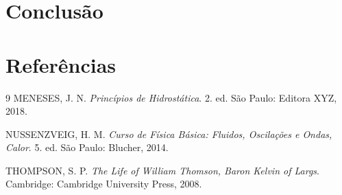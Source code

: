 \section{Conclusão}




\newpage
\section{Referências} {9}
	MENESES, J. N. \textit{Princípios de Hidrostática}. 2. ed. São Paulo: Editora XYZ, 2018.
	
	NUSSENZVEIG, H. M. \textit{Curso de Física Básica: Fluidos, Oscilações e Ondas, Calor}. 5. ed. São Paulo: Blucher, 2014.
	
	THOMPSON, S. P. \textit{The Life of William Thomson, Baron Kelvin of Largs}. Cambridge: Cambridge University Press, 2008.